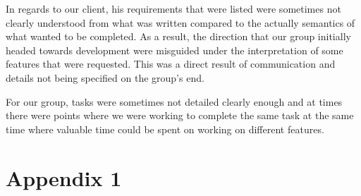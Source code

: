\documentclass[draftclsnofoot,10pt,onecolumn]{IEEEtran} %
\begin{document}
In regards to our client, his requirements that were listed were sometimes not
clearly understood from what was written compared to the actually semantics of
what wanted to be completed. As a result, the direction that our group initially
headed towards development were misguided under the interpretation of some
features that were requested. This was a direct result of communication and
details not being specified on the group's end.

For our group, tasks were sometimes not detailed clearly enough and at times
there were points where we were working to complete the same task at the same
time where valuable time could be spent on working on different features.

\section{Appendix 1}
\end{document}
